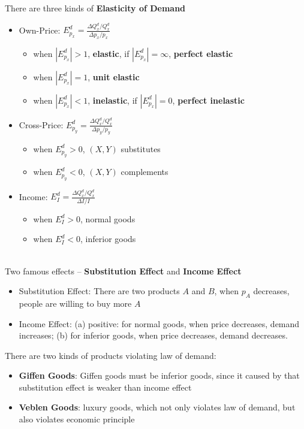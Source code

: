 \documentclass[11pt,a4paper]{article}
\begin{document}
There are three kinds of \textbf{Elasticity of Demand}
\begin{itemize}
    \item Own-Price: $E_{p_x}^d = \frac{\Delta Q_x^d / Q_x^d}{\Delta p_x / p_x}$
    \begin{itemize}
        \item when $|E_{p_x}^d| > 1$, \textbf{elastic}, if $|E_{p_x}^d| = \infty$, \textbf{perfect elastic}
        \item when $|E_{p_x}^d| = 1$, \textbf{unit elastic}
        \item when $|E_{p_x}^d| < 1$, \textbf{inelastic}, if $|E_{p_x}^d| = 0$, \textbf{perfect inelastic}
    \end{itemize}
    \item Cross-Price: $E_{p_y}^d = \frac{\Delta Q_x^d / Q_x^d}{\Delta p_y / p_y}$
    \begin{itemize}
        \item when $E_{p_y}^d > 0$, $(X,Y)$ substitutes
        \item when $E_{p_y}^d < 0$, $(X,Y)$ complements
    \end{itemize}
    \item Income: $E_{I}^d = \frac{\Delta Q_x^d / Q_x^d}{\Delta I / I}$
    \begin{itemize}
        \item when $E_I^d > 0$, normal goods 
        \item when $E_I^d < 0$, inferior goods
    \end{itemize}
\end{itemize}
{\color{red}{elastic $\Rightarrow$ price $p \downarrow$, total revenue $\uparrow$ \\ 
inelastic $\Rightarrow$ price $p \downarrow$, total revenue $\uparrow$}} \\ 
Two famous effects -- \textbf{Substitution Effect} and \textbf{Income Effect}
\begin{itemize}
    \item Substitution Effect: There are two products $A$ and $B$, when $p_A$ decreases, people are willing to buy more $A$
    \item Income Effect: (a) positive: for normal goods, when price decreases, demand increases; (b) for inferior goods, when price decreases, demand decreases.
\end{itemize}
There are two kinds of products violating law of demand:
\begin{itemize}
    \item \textbf{Giffen Goods}: Giffen goods must be inferior goods, since it caused by that substitution effect is weaker than income effect 
    \item \textbf{Veblen Goods}: luxury goods, which not only violates law of demand, but also violates economic principle
\end{itemize}
\end{document}
